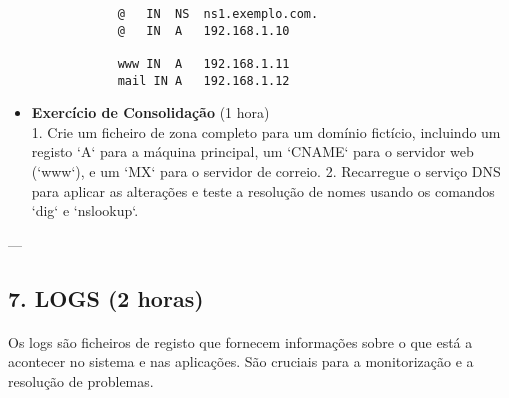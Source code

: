 \documentclass[10pt,a4paper]{article}
\begin{document}
\begin{itemize}
\begin{verbatim}
			@   IN  NS  ns1.exemplo.com.
			@   IN  A   192.168.1.10
			
			www IN  A   192.168.1.11
			mail IN A   192.168.1.12
		\end{verbatim}
		
		\item \textbf{Exercício de Consolidação} (1 hora) \\
		1. Crie um ficheiro de zona completo para um domínio fictício, incluindo um registo `A` para a máquina principal, um `CNAME` para o servidor web (`www`), e um `MX` para o servidor de correio.
		2. Recarregue o serviço DNS para aplicar as alterações e teste a resolução de nomes usando os comandos `dig` e `nslookup`.
	\end{itemize}
	
	---
	
	\subsection*{7. LOGS (2 horas)}
	\vspace{-1.2em}
	\paragraph{}
	Os logs são ficheiros de registo que fornecem informações sobre o que está a acontecer no sistema e nas aplicações. São cruciais para a monitorização e a resolução de problemas.
	
\end{document}
